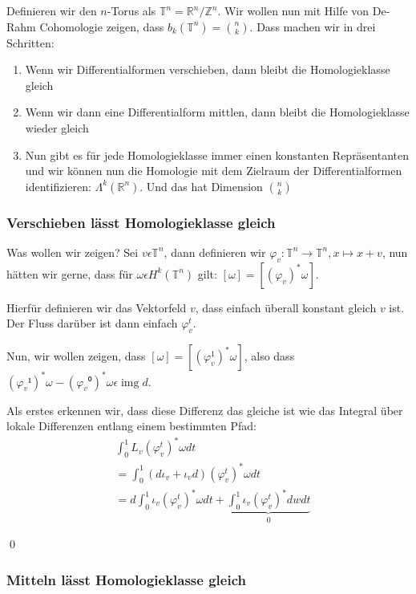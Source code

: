 \documentclass{article}
\DeclareMathOperator{\img}{img}
\begin{document}
	\newcommand{\torus}{\mathbb{T}^n}
	Definieren wir den $n$-Torus als $\torus = ℝ^n/ℤ^n$. Wir wollen nun mit Hilfe von De-Rahm Cohomologie zeigen, dass $b_k(\mathbb{T}^n) = \binom{n}{k}$. Dass machen wir in drei Schritten:
	\begin{enumerate}
		\item Wenn wir Differentialformen verschieben, dann bleibt die Homologieklasse gleich
		\item Wenn wir dann eine Differentialform mittlen, dann bleibt die Homologieklasse wieder gleich
		\item Nun gibt es für jede Homologieklasse immer einen konstanten Repräsentanten und wir können nun die Homologie mit dem Zielraum der Differentialformen identifizieren: $Λ^k(ℝ^n)$. Und das hat Dimension $\binom{n}{k}$
	\end{enumerate}

	\subsubsection{Verschieben lässt Homologieklasse gleich}

	Was wollen wir zeigen? Sei $v ϵ \torus$, dann definieren wir $φ_v: \torus → \torus, x ↦ x + v$, nun hätten wir gerne, dass für $ωϵH^k(\torus)$ gilt: $[ω] = [(φ_v)^* ω]$.

	\medskip

	Hierfür definieren wir das Vektorfeld $v$, dass einfach überall konstant gleich $v$ ist. Der Fluss darüber ist dann einfach $φ_v^t$.

	\medskip

	Nun, wir wollen zeigen, dass $[ω] = [(φ_v^1)^* ω]$, also dass $(φ_v¹)^* ω - (φ_v⁰)^* ω ϵ \img d$.

	\medskip

	Als erstes erkennen wir, dass diese Differenz das gleiche ist wie das Integral über lokale Differenzen entlang einem bestimmten Pfad:
	\begin{equation*}
		\begin{split}
			&\int_0^1 L_v (φ_v^t)^* ω dt \\
			&= \int_0^1 (dι_v + ι_vd) (φ_v^t)^* ω dt \\
			&= d \int_0^1 ι_v (φ_v^t)^* ω dt + \underbrace{\int_0^1 ι_v (φ_v^t)^* dw dt}_0
		\end{split}
	\end{equation*}

	\qed

	\subsubsection{Mitteln lässt Homologieklasse gleich}
\end{document}
